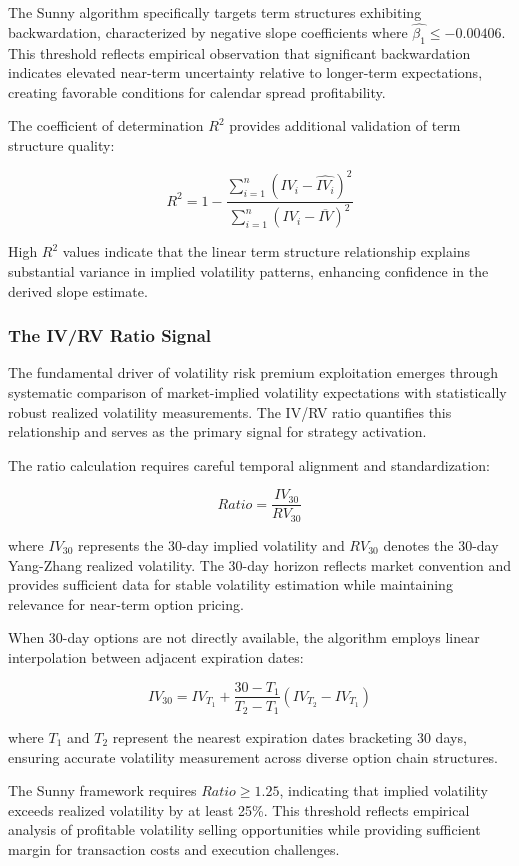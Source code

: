 \documentclass[
  american,
  11pt,
  11pt,
  letterpaper,
  onecolumn]{article}
\begin{document}
The Sunny algorithm specifically targets term structures exhibiting
backwardation, characterized by negative slope coefficients where
\(\hat{\beta_1} \leq -0.00406\). This threshold reflects empirical
observation that significant backwardation indicates elevated near-term
uncertainty relative to longer-term expectations, creating favorable
conditions for calendar spread profitability.

The coefficient of determination \(R^2\) provides additional validation
of term structure quality:

\[R^2 = 1 - \frac{\sum_{i=1}^{n}(IV_i - \hat{IV_i})^2}{\sum_{i=1}^{n}(IV_i - \overline{IV})^2}\]

High \(R^2\) values indicate that the linear term structure relationship
explains substantial variance in implied volatility patterns, enhancing
confidence in the derived slope estimate.

\subsubsection{The IV/RV Ratio Signal}\label{the-ivrv-ratio-signal}

The fundamental driver of volatility risk premium exploitation emerges
through systematic comparison of market-implied volatility expectations
with statistically robust realized volatility measurements. The IV/RV
ratio quantifies this relationship and serves as the primary signal for
strategy activation.

The ratio calculation requires careful temporal alignment and
standardization:

\[Ratio = \frac{IV_{30}}{RV_{30}}\]

where \(IV_{30}\) represents the 30-day implied volatility and
\(RV_{30}\) denotes the 30-day Yang-Zhang realized volatility. The
30-day horizon reflects market convention and provides sufficient data
for stable volatility estimation while maintaining relevance for
near-term option pricing.

When 30-day options are not directly available, the algorithm employs
linear interpolation between adjacent expiration dates:

\[IV_{30} = IV_{T_1} + \frac{30 - T_1}{T_2 - T_1}(IV_{T_2} - IV_{T_1})\]

where \(T_1\) and \(T_2\) represent the nearest expiration dates
bracketing 30 days, ensuring accurate volatility measurement across
diverse option chain structures.

The Sunny framework requires \(Ratio \geq 1.25\), indicating that
implied volatility exceeds realized volatility by at least 25\%. This
threshold reflects empirical analysis of profitable volatility selling
opportunities while providing sufficient margin for transaction costs
and execution challenges.
\end{document}
